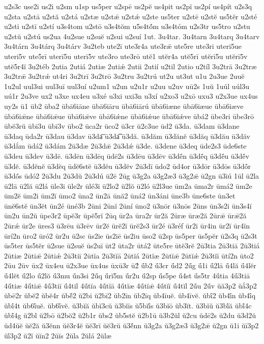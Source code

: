 {u2s3c
use2i
us2i
u2sm
u1sp
us5per
u2spē
us2pĕ
us4pit
us2pĭ
us2pí
us4pít
u2s3q
u2sta
u2stā
u2stă
u2stá
u2stæ
u2stǣ
u2stǽ
u2ste
us5ter
u2stē
u2stĕ
us5tĕr
u2sté
u2sti
u2stī
u2stí
u3s4tom
u2stō
u3s4tŏm
u5s4tŏ́m
u3s4tóm
u2s3tr
us5tro
u2stu
u2stŭ
u2stú
us2ua
4u2sue
u2suĕ
u2sui
u2suí
1ut.
3u4tar.
3u4tarn
3u4tarq
3u4tarv
3u4tárn
3u4tárq
3u4tárv
3u2teb
ute2ī
ute3r4a
ute3rǣ
ute5re
ute3ri
uteri5ue
uteri5v
ute5rī
uterī5u
uterī5v
ute3ro
ute3rō
utĕ1
utĕr4a
utĕ5rī
utĕrī5u
utĕrī5v
utĕ5r4ĭ
3u2téb
2utia
2utiá
2utiæ
2utiǽ
2utii
2utií
u2til
2utio
u2tíl
3u2trā
3u2træ
3u2trǣ
3u2trǽ
ut4ri
3u2trī
3u2trō
3u2tru
3u2trú
ut2u
ut3ut
u1u
2u3ue
2uuĕ
1u2ul
uul3ui
uul3uī
uul3uí
u2um1
u2un
u2u1r
u2uu
u2uv
uū2s
1uŭ
1uúl
uúl3u
uú1r
2u3ve
ux2
u3xe
ux4eu
u3xé
u3xi
uxi3n
u3xí
u2xo3
u2xō
uxu3
u2x3ue
ux4us
uy2s
ū1
ūb2
ūba2
ūbā6iāne
ūbā6iāru
ūbā6iārú
ūbā6iæne
ūbā6iæue
ūbā6iæve
ūbā6iǣne
ūbā6iǣue
ūbā6iǣve
ūbā6iǽne
ūbā6iǽue
ūbā6iǽve
ūbá2
ūbe3ri
ūbe3rō
ūbĕ3rŭ
ūbī3u
ūbī3v
ūbo2
ūca2r
ūco2
ū3cr
ū2c3ue
ūd2
ū3da.
ū3dam
ū3dane
ū3daq
ūda2r
ū3dau
ū3dav
ū3da͞
ū3da͡
ū3dă.
ū3dăm
ū3dănĕ
ū3dăq
ū3dău
ū3dăv
ū3dắm
ūdá2
ū3dám
2ū3dæ
2ū3dǣ
2ū3dǽ
ū3de.
ū3dene
ū3deq
ūde2s3
ūde6ste
ū3deu
ū3dev
ū3dē.
ū3dēn
ū3dēq
ūdē2s
ū3dēu
ū3dēv
ū3dḗn
ū3dḗq
ū3dḗu
ū3dḗv
ū3dĕ.
ū3dĕnĕ
ū3dĕq
ūdĕ6stĕ
ū3dĕu
ū3dĕv
2ū3dī
ūdo2
ūd4or
ū3dōr
ū3dōs
ū3dṓr
ū3dṓs
ūdó2
2ū3du
2ū3dŭ
2ū3dú
ū2ē
2ūg
ū3g2a
ū3g2æ3
ū3g2ǣ
ū2gn
ū3iú
1ūl
ū2la
ū2lā
ū2lă
ū2lá
ūle3i
ūle2r
ūlé3i
ū2lo2
ū2lŏ
ū2ló
ū2l3ue
ūm2a
ūma2r
ūmá2
ūm2e
ūm2ĕ
ūm2i
ūm2ĭ
ūmo2
ūna2
ūn2ā
ūnă2
ūná2
ūn3áni
ūne3b
ūne6ste
ūn3et
ūnĕ6stĕ
ūn3ĕt
ūn2é
ūné3b
2ūni
2ūnĭ
2ūní
ūno2
ū3nōr
ū3nōs
2ūns
ūn3s2i
ūn3s4ĭ
ūn2u
ūn2ŭ
ūpe3r2
ūpĕ3r
ūpĕ5rĭ
2ūq
ūr2a
ūra2r
ūr2ă
2ūræ
ūræ2ă
2ūrǣ
ūrǣ2ă
2ūrǽ
ūr2e
ūres3
ū3rēu
ū3rēv
ūr2ĕ
ūrĕ2ĭ
ūrĕ2s3
ūr2é
ū3réf
ūr2i
ūr4in
ūr2ĭ
ūr4ĭn
ūrí2n
ūro2
ūró2
ūr2u
ū2sc
ūs2ie
ūs2iē
ūs2iu
ūso2
ū2sp
ūs5per
ūs5pĕr
ū2s3q
ū2s3t
ūs5ter
ūs5tĕr
ū2sue
ū2suĕ
ūs2uī
ūt2
ūta2r
ūtá2
ūte5re
ūtĕ3rĕ
2ū3tia
2ū3tiā
2ū3tiá
2ūtiæ
2ūtiǣ
2ūtiǽ
2ū3tiī
2ūtĭa
2ū3tĭā
2ūtĭá
2ūtĭæ
2ūtĭǣ
2ūtĭǽ
2ū3tĭī
ūtí2n
ūto2
2ūu
2ūv
ūx2
ūx4eu
ū2x3ue
ūx4us
ūxū3r
ū2́
ū́b2
ū́3cr
ū́d2
2ū́g
ū́1i
ū́2lā
ū́4lă
ū́4lĕr
ū́4lĕt
ū́2lo
ū́2lŏ
ū́3mu
ū́n3si
2ū́q
ū́rĭ5m
ū́r2u
ū́2sp
ū́s5pe
ū́4st
ū́s5tr
4ū́tia
4ū́3tiā
4ū́tiæ
4ū́tiǣ
4ū́3tiī
ū́4til
4ū́tĭa
4ū́tĭā
4ū́tĭæ
4ū́tĭǣ
4ū́tĭī
ū́4tĭl
2ū́u
2ū́v
ŭă3p2
ŭắ3p2
ŭbē2r
ŭbĕ2
ŭbĕ4r
ŭbĕ́2
ŭ2bi
ŭ2bī2
ŭb2īn
ŭb2īq
ŭb4īuĕ.
ŭb4īvĕ.
ŭbī́2
ŭb4ī́n
ŭb4ī́q
ŭbī́4t
ŭb6ī́uĕ.
ŭb6ī́vĕ.
ŭ3bĭă
ŭbĭ3cŭ
ŭ3bĭīs
ŭ5bĭī́s
ŭ3bĭō
ŭb3ĭt.
ŭ3bĭŭ
ŭ3bĭ́ă
ŭbĭ́4c
ŭbĭ́4g
ŭ2bl
ŭ2bō
ŭ2bŏ2
ŭ2b1r
ŭbs2
ŭb5stĕ
ŭ2b1ū
ŭ3b2ŭl
ŭ2cu
ŭdē2s
ŭ2du
ŭ3d2ŭ
ŭd4ŭĕ
ŭĕ2ă
ŭ3ĕnn
ŭĕ3r4ĕ
ŭĕ3rī
ŭĕ3rŭ
ŭ3ĕ́nn
ŭ3g2a
ŭ3g2æ3
ŭ3g2ǣ
ŭ2gn
ŭ1i
ŭī3p2
ŭī́3p2
ŭ2ĭ
ŭĭn2
2ŭĭs
2ŭla
2ŭlá
2ŭlæ
}
